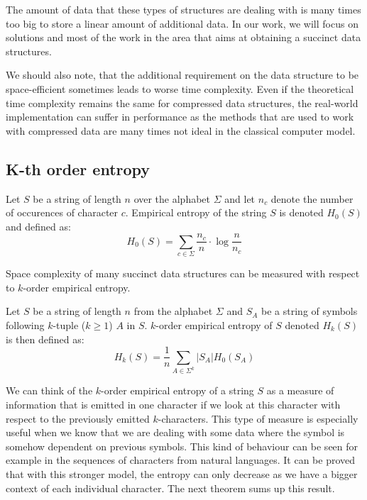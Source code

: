 The amount of data that these types of structures are dealing with is many times too big to store a linear amount of additional data. In our work, we will focus on solutions and most of the work in the area that aims at obtaining a succinct data structures.

We should also note, that the additional requirement on the data structure to be space-efficient sometimes leads to worse time complexity. Even if the theoretical time complexity remains the same for compressed data structures, the real-world implementation can suffer in performance as the methods that are used to work with compressed data are many times not ideal in the classical computer model.

\subsection{K-th order entropy}

\begin{definition}
Let $S$ be a string of length $n$ over the alphabet $\Sigma$ and let $n_c$ denote the number of occurences of character
$c$. Empirical entropy of the string $S$ is denoted $H_0(S)$ and defined as:
$$H_0(S) = \sum_{c \in \Sigma} \frac{n_c}{n}\cdot \log\frac{n}{n_c}$$
\end{definition}

Space complexity of many succinct data structures can be measured with respect to $k$-order empirical entropy.

\begin{definition}
Let $S$ be a string of length $n$ from the alphabet $\Sigma$ and $S_A$ be a string of symbols following $k$-tuple ($k \geq 1$) $A$ in $S$. $k$-order empirical entropy of $S$ denoted $H_k(S)$ is then defined as:
$$H_k(S) = \frac{1}{n} \sum_{A \in \Sigma^k} |S_A| H_0(S_A)$$
\end{definition}

We can think of the $k$-order empirical entropy of a string $S$ as a measure of information that is emitted in one character if we look at this character with respect to the previously emitted $k$-characters. This type of measure is especially useful when we know that we are dealing with some data where the symbol is somehow dependent on previous symbols. This kind of behaviour can be seen for example in the sequences of characters from natural languages. It can be proved that with this stronger model, the entropy can only decrease as we have a bigger context of each individual character. The next theorem sums up this result.

